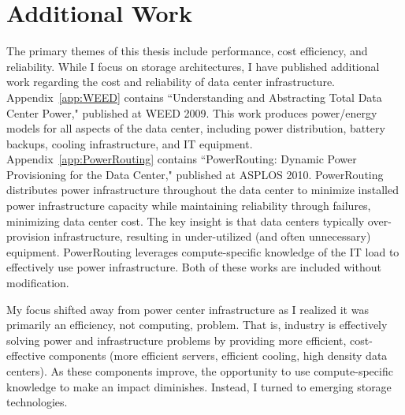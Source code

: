 \section{Additional Work}
\label{sec:Intro:Additional}
The primary themes of this thesis include performance, cost efficiency, and reliability.
While I focus on storage architectures, I have published additional work regarding the cost and reliability of data center infrastructure.
Appendix~\ref{app:WEED} contains ``Understanding and Abstracting Total Data Center Power," \cite{PelleyMeisner09} published at WEED 2009.
This work produces power/energy models for all aspects of the data center, including power distribution, battery backups, cooling infrastructure, and IT equipment.
Appendix~\ref{app:PowerRouting} contains ``PowerRouting: Dynamic Power Provisioning for the Data Center," \cite{PelleyMeisner10} published at ASPLOS 2010.
PowerRouting distributes power infrastructure throughout the data center to minimize installed power infrastructure capacity while maintaining reliability through failures, minimizing data center cost.
The key insight is that data centers typically over-provision infrastructure, resulting in under-utilized (and often unnecessary) equipment.
PowerRouting leverages compute-specific knowledge of the IT load to effectively use power infrastructure.
Both of these works are included without modification.

My focus shifted away from power center infrastructure as I realized it was primarily an efficiency, not computing, problem.
That is, industry is effectively solving power and infrastructure problems by providing more efficient, cost-effective components (more efficient servers, efficient cooling, high density data centers).
As these components improve, the opportunity to use compute-specific knowledge to make an impact diminishes.
Instead, I turned to emerging storage technologies.

